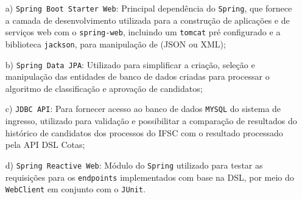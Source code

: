 \begin{enumerate}
 
\item[a)] \texttt{Spring Boot Starter Web}: Principal dependência do \texttt{Spring}, que fornece a camada de desenvolvimento utilizada para a construção de aplicações e de serviços web com o \texttt{spring-web}, incluindo um \texttt{tomcat} pré configurado e a biblioteca \texttt{jackson}, para manipulação de (JSON ou XML);


\item[b)] \texttt{Spring Data JPA}:  Utilizado para simplificar a criação, seleção e manipulação das entidades de banco de dados criadas para processar o algoritmo de classificação e aprovação de candidatos; 

\item[c)] \texttt{JDBC API}: Para fornecer acesso ao banco de dados \texttt{MYSQL} do sistema de ingresso, utilizado para validação e possibilitar a comparação de resultados do histórico de candidatos dos processos do \gls{IFSC} com o resultado processado pela \gls{API} DSL Cotas; 


\item[d)] \texttt{Spring Reactive Web}: Módulo do \texttt{Spring} utilizado para testar as requisições para os \texttt{endpoints} implementados com base na DSL, por meio do \texttt{WebClient} em conjunto com o \texttt{JUnit}.

\end{enumerate}

